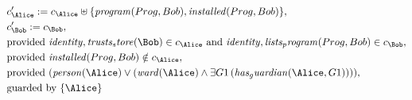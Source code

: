 \begin{align*}
&
c'_
{
\Alice
}
 := 
c_
{
\Alice
}
 \uplus 
\{
\mathit{
program
}
(
Prog
,
Bob
)
,
\mathit{
installed
}
(
Prog
,
Bob
)
\}
,\\
&
c'_
{
\Bob
}
 := 
c_
{
\Bob
}
,\\
&
\text{provided } 
\mathit{
identity
}
,
\mathit{
trusts_store
}
(
\Bob
)
 \in c_
{
\Alice
}
 \text{ and } 
\mathit{
identity
}
,
\mathit{
lists_program
}
(
Prog
,
Bob
)
 \in c_
{
\Bob
}
,\\
&
\text{provided } 
\mathit{
installed
}
(
Prog
,
Bob
)
 \notin c_
{
\Alice
}
,\\
&
\text{provided } 
(
\mathit{
person
}
(
\Alice
)
\lor
(
\mathit{
ward
}
(
\Alice
)
\land
\exists 
G1
\,(
\mathit{
has_guardian
}
(
\Alice
,
G1
)
)
)
)
,\\
&
\text{guarded by } \{
\Alice
\}
\end{align*}
